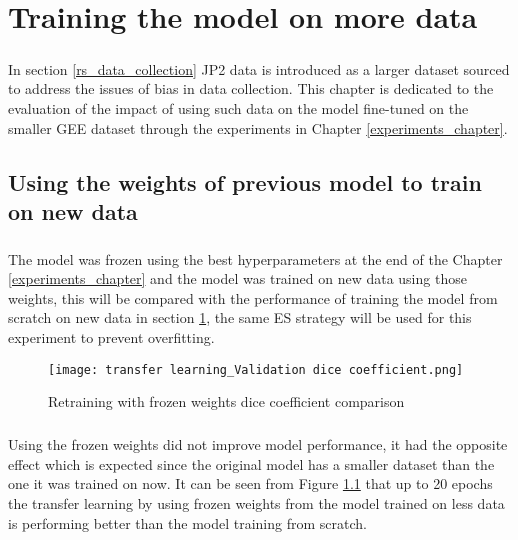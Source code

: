 \chapter{Training the model on more data} \label{new_data_train}
\paragraph{}
In section \ref{rs_data_collection} JP2 data is introduced as a larger dataset sourced to address the issues of bias in data collection. This chapter is dedicated to the evaluation of the impact of using such data on the model fine-tuned on the smaller GEE dataset through the experiments in Chapter \ref{experiments_chapter}.

\section{Using the weights of previous model to train on new data}
\paragraph{}
The model was frozen using the best hyperparameters at the end of the Chapter \ref{experiments_chapter} and the model was trained on new data using those weights, this will be compared with the performance of training the model from scratch on new data in section \ref{new_data_train}, the same ES strategy will be used for this experiment to prevent overfitting.

\begin{figure}[hbt!]
    \centering
    \texttt{[image: transfer learning\_Validation dice coefficient.png]}
    \caption{Retraining with frozen weights dice coefficient comparison}
    \label{rt_dice}
\end{figure}
\paragraph{}
Using the frozen weights did not improve model performance, it had the opposite effect which is expected since the original model has a smaller dataset than the one it was trained on now. It can be seen from Figure \ref{rt_dice} that up to 20 epochs the transfer learning by using frozen weights from the model trained on less data is performing better than the model training from scratch. 

